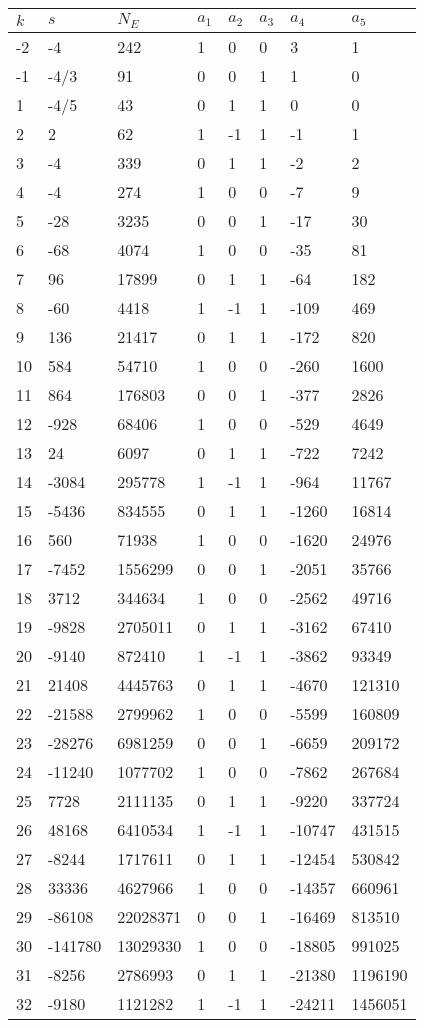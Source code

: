 \documentclass{amsart}
\begin{document}
\begin{longtable}{|l|l|l|lllll|}
\hline
$k$ & $s$ & $N_E$ & $a_1$ & $a_2$ & $a_3$ & $a_4$ & $a_5$\\
\hline
-2&-4&242&1&0&0&3&1\\
-1&-4/3&91&0&0&1&1&0\\
1&-4/5&43&0&1&1&0&0\\
2&2&62&1&-1&1&-1&1\\
3&-4&339&0&1&1&-2&2\\
4&-4&274&1&0&0&-7&9\\
5&-28&3235&0&0&1&-17&30\\
6&-68&4074&1&0&0&-35&81\\
7&96&17899&0&1&1&-64&182\\
8&-60&4418&1&-1&1&-109&469\\
9&136&21417&0&1&1&-172&820\\
10&584&54710&1&0&0&-260&1600\\
11&864&176803&0&0&1&-377&2826\\
12&-928&68406&1&0&0&-529&4649\\
13&24&6097&0&1&1&-722&7242\\
14&-3084&295778&1&-1&1&-964&11767\\
15&-5436&834555&0&1&1&-1260&16814\\
16&560&71938&1&0&0&-1620&24976\\
17&-7452&1556299&0&0&1&-2051&35766\\
18&3712&344634&1&0&0&-2562&49716\\
19&-9828&2705011&0&1&1&-3162&67410\\
20&-9140&872410&1&-1&1&-3862&93349\\
21&21408&4445763&0&1&1&-4670&121310\\
22&-21588&2799962&1&0&0&-5599&160809\\
23&-28276&6981259&0&0&1&-6659&209172\\
24&-11240&1077702&1&0&0&-7862&267684\\
25&7728&2111135&0&1&1&-9220&337724\\
26&48168&6410534&1&-1&1&-10747&431515\\
27&-8244&1717611&0&1&1&-12454&530842\\
28&33336&4627966&1&0&0&-14357&660961\\
29&-86108&22028371&0&0&1&-16469&813510\\
30&-141780&13029330&1&0&0&-18805&991025\\
31&-8256&2786993&0&1&1&-21380&1196190\\
32&-9180&1121282&1&-1&1&-24211&1456051\\

\end{longtable}
\end{document}
